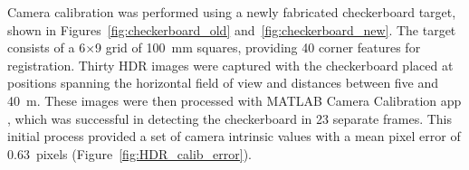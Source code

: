 \documentclass[../main.tex]{subfiles}
\begin{document}

Camera calibration was performed using a newly fabricated checkerboard target, shown in Figures~\ref{fig:checkerboard_old} and~\ref{fig:checkerboard_new}.  
The target consists of a 6$\times$9 grid of 100~mm squares, providing 40 corner features for registration.  
Thirty HDR images were captured with the checkerboard placed at positions spanning the horizontal field of view and distances between five and 40~m.
These images were then processed with MATLAB Camera Calibration app \cite{matlab_calibration}, which was successful in detecting the checkerboard in 23 separate frames.  
This initial process provided a set of camera intrinsic values with a mean pixel error of 0.63~pixels (Figure~\ref{fig:HDR_calib_error}).




\end{document}
